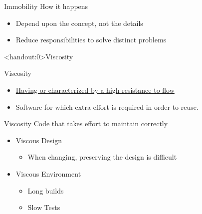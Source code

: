 \documentclass[xcolor=svgnames]{beamer}
\begin{document}

{%
%
\begin{frame}{Immobility}
    How it happens
    \begin{itemize}
        \item<1-> Depend upon the concept, not the details
        \item<2-> Reduce responsibilities to solve distinct problems
    \end{itemize}
\end{frame}
}


{%
%
\begin{frame}<handout:0>{Viscosity}
\end{frame}
}

{%
%
\begin{frame}{Viscosity}

    \begin{itemize}
        \item \href{https://www.merriam-webster.com/dictionary/viscous}
            {Having or characterized by a high resistance to flow}
        \item<2-> Software for which extra effort is required in order to reuse.
    \end{itemize}
\end{frame}
}


{%
%
\begin{frame}{Viscosity}
    Code that takes effort to maintain correctly

    \begin{itemize}
        \item<2->Viscous Design
        \begin{itemize}
            \item<4->When changing, preserving the design is difficult
        \end{itemize}
        \item<3->Viscous Environment
        \begin{itemize}
            \item<5->Long builds
            \item<6->Slow Tests
        \end{itemize}
    \end{itemize}
\end{frame}
}
\end{document}
